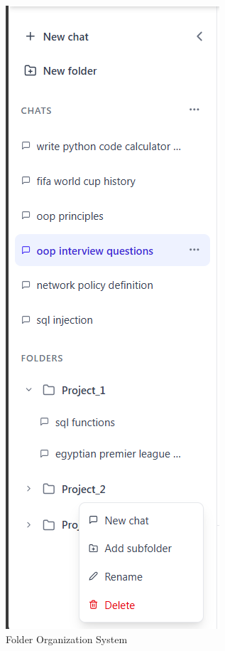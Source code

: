 \begin{figure}[p]
    \centering
    \includegraphics[width=\textwidth]{./Chapter07/figures/folder_organization_ui.png}
    \caption{Folder Organization System}
    \label{fig:folder-organization-ui}
\end{figure}
\clearpage

